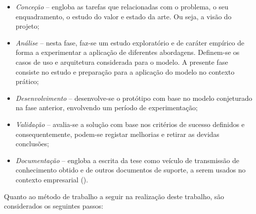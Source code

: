 \begin{itemize}
    \item
    {
        \textit{Conceção} -- engloba as tarefas que relacionadas com o problema, o seu enquadramento, o estudo do valor e estado da arte. Ou seja, a visão do projeto;
    }
    \item
    {
        \textit{Análise} -- nesta fase, faz-se um estudo exploratório e de caráter empírico de forma a experimentar a aplicação de diferentes abordagens. Definem-se os casos de uso e arquitetura considerada para o modelo. A presente fase consiste no estudo e preparação para a aplicação do modelo no contexto prático; 
    }
    \item
    {
        \textit{Desenvolvimento} -- desenvolve-se o protótipo com base no modelo conjeturado na fase anterior, envolvendo um período de experimentação;
    }
    \item
    {
        \textit{Validação} -- avalia-se a solução com base nos critérios de sucesso definidos e consequentemente, podem-se registar melhorias e retirar as devidas conclusões;
    }
    \item
    {
        \textit{Documentação} -- engloba a escrita da tese como veículo de transmissão de conhecimento obtido e de outros documentos de suporte, a serem usados no contexto empresarial ().
    }
\end{itemize}

Quanto ao método de trabalho a seguir na realização deste trabalho, são considerados os seguintes passos:


